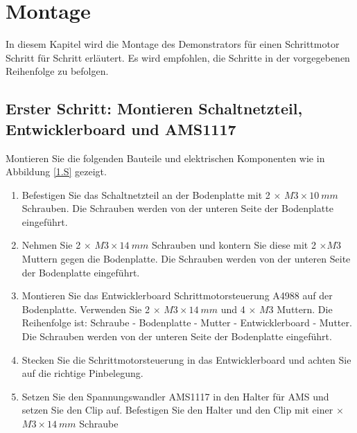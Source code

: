 %

\chapter{Montage}\label{Mont}
In diesem Kapitel wird die Montage des Demonstrators für einen Schrittmotor Schritt für Schritt erläutert. Es wird empfohlen, die Schritte in der vorgegebenen Reihenfolge zu befolgen.


\section{Erster Schritt: Montieren Schaltnetzteil, Entwicklerboard und AMS1117}
 Montieren Sie die folgenden Bauteile und elektrischen Komponenten wie in Abbildung \ref{1.S} gezeigt. 
 
\begin{enumerate}
 	\item Befestigen Sie das Schaltnetzteil an der Bodenplatte mit 2 $\times$ $ M3 \times 10 \ mm $ Schrauben. Die Schrauben werden von der unteren Seite der Bodenplatte eingeführt. 
 	\item Nehmen Sie 2 $\times$ $ M3 \times 14 \ mm $ Schrauben und kontern Sie diese mit 2 $\times M3 $ Muttern gegen die Bodenplatte. Die Schrauben werden von der unteren Seite der Bodenplatte eingeführt.
 	\item Montieren Sie das Entwicklerboard Schrittmotorsteuerung A4988 auf der Bodenplatte. Verwenden Sie 2 $\times$ $ M3 \times 14 \ mm $ und 4 $\times$ $ M3 $ Muttern. Die Reihenfolge ist: Schraube - Bodenplatte - Mutter - Entwicklerboard - Mutter. Die Schrauben werden von der unteren Seite der Bodenplatte eingeführt.
 	\item Stecken Sie die Schrittmotorsteuerung in das Entwicklerboard und achten Sie auf die richtige Pinbelegung.
 	\item Setzen Sie den Spannungswandler AMS1117 in den Halter für AMS und setzen Sie den Clip auf. Befestigen Sie den Halter und den Clip mit einer  $\times$ $ M3 \times 14 \ mm $ Schraube
\end{enumerate}
 
